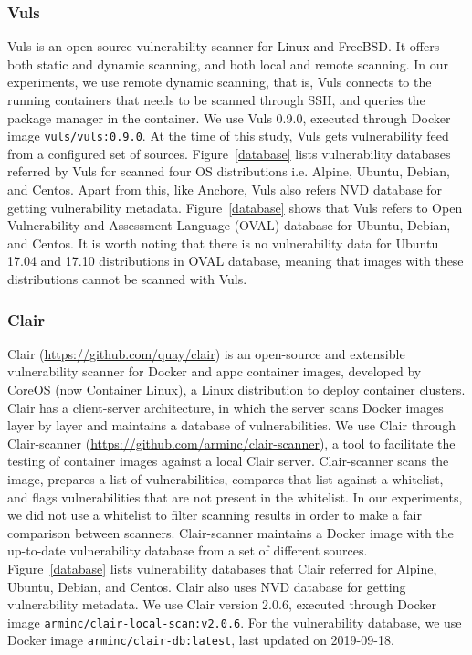\documentclass[a4paper,num-refs]{oup-contemporary}
\begin{document}
\subsubsection{Vuls}

Vuls is an open-source vulnerability scanner for Linux and FreeBSD. It
offers both static and dynamic scanning, and both local and remote
scanning. In our experiments, we use remote dynamic scanning, that is, Vuls
connects to the running containers that needs to be scanned through SSH, and queries the package manager
in the container. We use Vuls 0.9.0, executed through Docker image
\texttt{vuls/vuls:0.9.0}. At the time of this study, Vuls gets vulnerability feed
from a configured set of sources. Figure~\ref{database} lists vulnerability databases
referred by Vuls for scanned four OS distributions i.e. Alpine, Ubuntu, Debian, and Centos.
Apart from this, like Anchore, Vuls also refers NVD database for getting vulnerability metadata.
Figure~\ref{database} shows that Vuls
refers to Open Vulnerability and Assessment Language (OVAL) database for Ubuntu, Debian, and Centos.
It is worth noting that there is
no vulnerability data for Ubuntu 17.04 and 17.10 distributions in OVAL database, meaning that images
with these distributions cannot be scanned with Vuls.

\subsubsection{Clair}

Clair (\url{https://github.com/quay/clair}) is an open-source and extensible
vulnerability scanner for Docker and appc container images, developed by
CoreOS (now Container Linux), a Linux distribution to deploy container
clusters. Clair has a client-server architecture, in which the server
scans Docker images layer by layer and maintains a database of vulnerabilities. We use Clair through Clair-scanner
(\url{https://github.com/arminc/clair-scanner}), a tool to facilitate the testing
of container images against a local Clair server. Clair-scanner scans the image,
prepares a list of vulnerabilities, compares that list against a
whitelist, and flags vulnerabilities that are not present in the whitelist.
In our experiments, we did not use a whitelist to filter scanning results in
order to make a fair comparison between scanners.
Clair-scanner maintains a Docker image with the up-to-date vulnerability
database from a set of different sources. Figure~\ref{database} lists
vulnerability databases that Clair referred for Alpine, Ubuntu, Debian, and Centos.
Clair also uses NVD database for getting vulnerability metadata.
We use Clair version 2.0.6, executed through
Docker image \texttt{arminc/clair-local-scan:v2.0.6}. For the vulnerability
database, we use Docker image \texttt{arminc/clair-db:latest}, last
updated on 2019-09-18.
\end{document}
